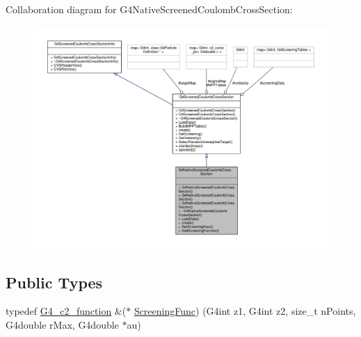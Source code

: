Collaboration diagram for G4\+Native\+Screened\+Coulomb\+Cross\+Section\+:
\nopagebreak
\begin{figure}[H]
\begin{center}
\leavevmode
\includegraphics[width=350pt]{classG4NativeScreenedCoulombCrossSection__coll__graph}
\end{center}
\end{figure}
\subsection*{Public Types}
\begin{DoxyCompactItemize}
\item 
typedef \hyperlink{G4ScreenedNuclearRecoil_8hh_a679aa602c6cfde1625601e0314b3cc01}{G4\+\_\+c2\+\_\+function} \&($\ast$ \hyperlink{classG4NativeScreenedCoulombCrossSection_a0b6a4f30e2047969238512fabfa49b11}{Screening\+Func}) (G4int z1, G4int z2, size\+\_\+t n\+Points, G4double r\+Max, G4double $\ast$au)
\end{DoxyCompactItemize}
